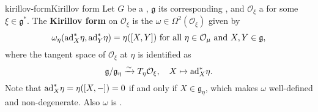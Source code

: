 \begin{topic}{kirillov-form}{Kirillov form}
    Let $G$ be a , $\mathfrak{g}$ its corresponding , and $\mathcal{O}_\xi$ a  for some $\xi \in \mathfrak{g}^*$. The \textbf{Kirillov form} on $\mathcal{O}_\xi$ is the  $\omega \in \Omega^2(\mathcal{O}_\xi)$ given by
    \[ \omega_\eta(\textup{ad}_X^* \eta, \textup{ad}_Y^* \eta) = \eta([X, Y]) \textup{ for all } \eta \in \mathcal{O}_\mu \textup{ and } X, Y \in \mathfrak{g} , \]
    where the tangent space of $\mathcal{O}_\xi$ at $\eta$ is identified as
    \[ \mathfrak{g}/\mathfrak{g}_\eta \xrightarrow{\sim} T_\eta \mathcal{O}_\xi, \quad X \mapsto \textup{ad}_X^* \eta . \]
    Note that $\textup{ad}_X^* \eta = \eta([X, -]) = 0$ if and only if $X \in \mathfrak{g}_\eta$, which makes $\omega$ well-defined and non-degenerate. Also $\omega$ is .
\end{topic}
